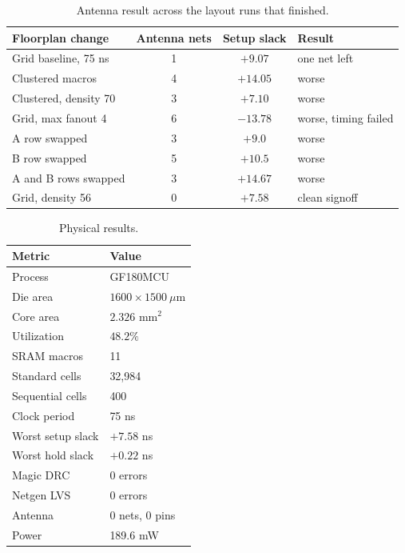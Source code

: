 \documentclass[conference]{IEEEtran}
\begin{document}
\begin{table}[h]
\caption{Antenna result across the layout runs that finished.}
\label{tab:antenna}
\centering
\renewcommand{\arraystretch}{1.15}
\begin{tabular}{@{}lccl@{}}
\toprule
Floorplan change & Antenna nets & Setup slack & Result \\
\midrule
Grid baseline, 75 ns  & 1 & $+9.07$  & one net left \\
Clustered macros      & 4 & $+14.05$ & worse \\
Clustered, density 70 & 3 & $+7.10$  & worse \\
Grid, max fanout 4    & 6 & $-13.78$ & worse, timing failed \\
A row swapped         & 3 & $+9.0$   & worse \\
B row swapped         & 5 & $+10.5$  & worse \\
A and B rows swapped  & 3 & $+14.67$ & worse \\
Grid, density 56      & 0 & $+7.58$  & clean signoff \\
\bottomrule
\end{tabular}
\end{table}

\begin{table}[h]
\caption{Physical results.}
\label{tab:signoff}
\centering
\renewcommand{\arraystretch}{1.15}
\begin{tabular}{@{}ll@{}}
\toprule
Metric & Value \\
\midrule
Process & GF180MCU \\
Die area & $1600\times1500~\mu$m \\
Core area & $2.326$ mm$^2$ \\
Utilization & $48.2\%$ \\
SRAM macros & 11 \\
Standard cells & 32,984 \\
Sequential cells & 400 \\
Clock period & 75 ns \\
Worst setup slack & $+7.58$ ns \\
Worst hold slack & $+0.22$ ns \\
Magic DRC & 0 errors \\
Netgen LVS & 0 errors \\
Antenna & 0 nets, 0 pins \\
Power & 189.6 mW \\
\bottomrule
\end{tabular}
\end{table}
\end{document}
